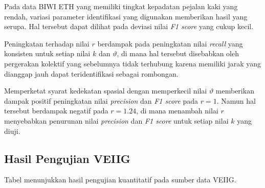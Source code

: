 Pada data BIWI ETH yang memiliki tingkat kepadatan pejalan kaki yang rendah, variasi parameter identifikasi yang digunakan memberikan hasil yang serupa. Hal tersebut dapat dilihat pada deviasi nilai \textit{F1 score} yang cukup kecil.

Peningkatan terhadap nilai $r$ berdampak pada peningkatan nilai \textit{recall} yang konsisten untuk setiap nilai $k$ dan $\vartheta$, di mana hal tersebut disebabkan oleh pergerakan kolektif yang sebelumnya tidak terhubung karena memiliki jarak yang dianggap jauh dapat teridentifikasi sebagai rombongan.

Memperketat syarat kedekatan spasial dengan memperkecil nilai $\vartheta$ memberikan dampak positif peningkatan nilai \textit{precision} dan \textit{F1 score} pada $r = 1$. Namun hal tersebut berdampak negatif pada $r = 1.24$, di mana menambah nilai $r$ menyebabkan penurunan nilai \textit{precision} dan \textit{F1 score} untuk setiap nilai $k$ yang diuji.
 
\subsection{Hasil Pengujian VEIIG}
\label{subsec:veiig-result}

Tabel menunjukkan hasil pengujian kuantitatif pada sumber data VEIIG.